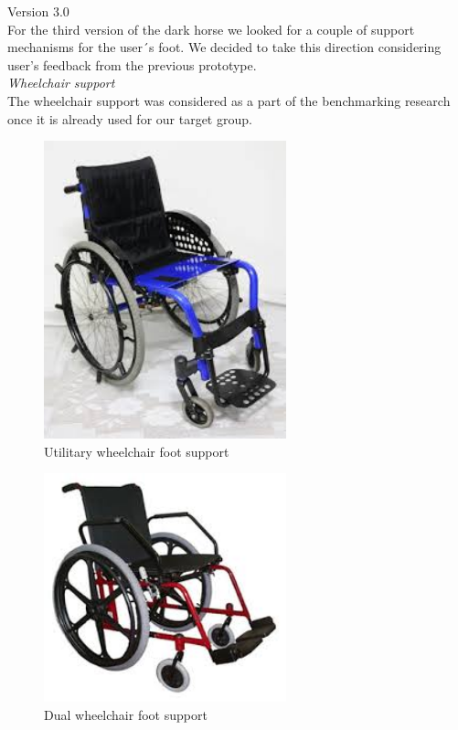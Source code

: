 \noindent Version 3.0 \\

For the third version of the dark horse we looked for a couple of support mechanisms for the user´s foot. We decided to take this direction considering user’s feedback from the previous prototype. \\

\noindent\emph{Wheelchair support}\\
 The wheelchair support was considered as a part of the benchmarking research once it is already used for our target group. 

\begin{figure}[h]
\centering
\includegraphics[width=7cm]{brazil_images/image022.jpg}
\caption{Utilitary wheelchair foot support} %
\label{fig:utilitary_wheelchair}
\end{figure}


\begin{figure}[h]
\centering
\includegraphics[width=7cm]{brazil_images/image023.jpg}
\caption{Dual wheelchair foot support}%
\label{fig:dual_wheelchair}
\end{figure}

